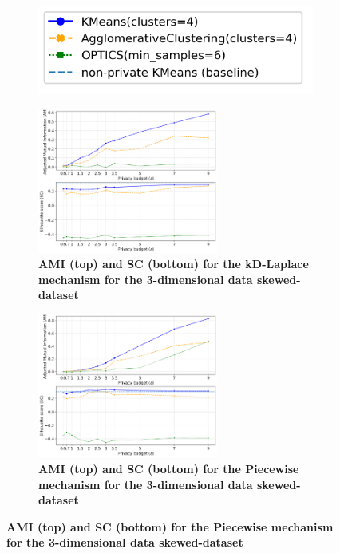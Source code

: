 \begin{figure}[H]
  \centering
  \begin{subfigure}{0.3\textwidth}
    \includegraphics[width=\textwidth]{Results/kd-laplace/kd-Laplace/skewed-dataset/legend_3.png}
  \end{subfigure}
  \begin{subfigure}{1\textwidth}
    \caption{\textbf{AMI (top) and SC (bottom) for the kD-Laplace mechanism for the 3-dimensional data skewed-dataset}}
    \centering
    \includegraphics[width=0.65\textwidth]{Results/kd-laplace/kd-Laplace/skewed-dataset/ami-and-sc_3_dimensions.png}
    \centering
  \end{subfigure}
  \begin{subfigure}{1\textwidth}
    \caption{\textbf{AMI (top) and SC (bottom) for the Piecewise mechanism for the 3-dimensional data skewed-dataset}}
    \centering
    \includegraphics[width=0.65\textwidth]{Results/kd-laplace/piecewise/skewed-dataset/ami-and-sc_3_dimensions.png}
  \end{subfigure}
  \label{fig:validation-skewed-dataset_comparison_3d-laplace}
\end{figure}
